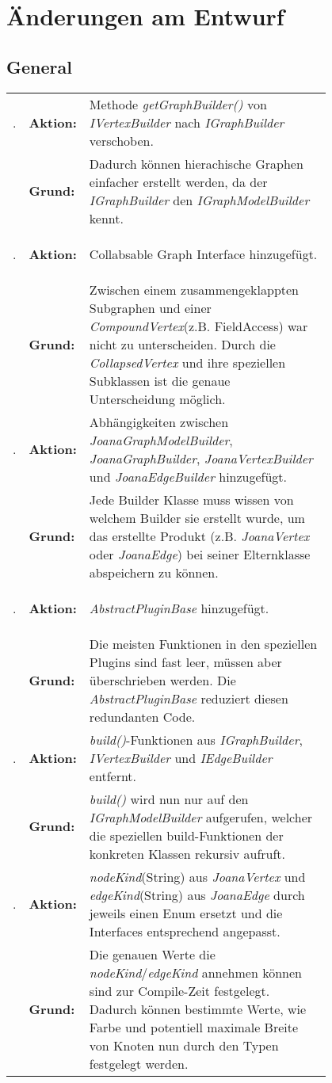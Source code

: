 \chapter{Änderungen am Entwurf}
\label{ch:aenderungen}

\newcommand\change[2]{\textbf{\arabic{cnr}}\addtocounter{cnr}{1}. & \textbf{Aktion:} & #1 \\ & \textbf{Grund:} & #2 \\ [1ex] }
\newcommand\inlineCode[1]{{\lstinline[basicstyle=\ttfamily\color{black}]|#1|}}
\section{General}
\setcounter{cnr}{1}

\begin{longtable}{llp{0.8\linewidth}}
	\change	{Methode \textit{getGraphBuilder()} von \textit{IVertexBuilder} nach  \textit{IGraphBuilder} verschoben.} 
			{Dadurch können hierachische Graphen einfacher erstellt werden, da der \textit{IGraphBuilder} den \textit{IGraphModelBuilder} kennt.}
			
	\change	{Collabsable Graph Interface hinzugefügt.} 
			{Zwischen einem zusammengeklappten Subgraphen und einer \textit{CompoundVertex}(z.B. FieldAccess) war nicht zu unterscheiden. Durch die \textit{CollapsedVertex} und ihre speziellen Subklassen ist die genaue Unterscheidung möglich.}
			
	\change	{Abhängigkeiten zwischen \textit{JoanaGraphModelBuilder}, \textit{JoanaGraphBuilder}, 
			\textit{JoanaVertexBuilder} und \textit{JoanaEdgeBuilder} hinzugefügt.} 
			{Jede Builder Klasse muss wissen von welchem Builder sie erstellt wurde, um das erstellte Produkt (z.B. \textit{JoanaVertex} oder \textit{JoanaEdge}) bei seiner Elternklasse abspeichern zu können.}
	
	\change	{\textit{AbstractPluginBase} hinzugefügt.} 
			{Die meisten Funktionen in den speziellen Plugins sind fast leer, müssen aber überschrieben werden. Die \textit{AbstractPluginBase} reduziert diesen redundanten Code.}
	
	\change	{\textit{build()}-Funktionen aus \textit{IGraphBuilder}, \textit{IVertexBuilder} und \textit{IEdgeBuilder} 
			entfernt.} 
			{\textit{build()} wird nun nur auf den \textit{IGraphModelBuilder} aufgerufen, welcher die speziellen build-Funktionen der konkreten Klassen rekursiv aufruft.}
	
	\change	{\textit{nodeKind}(String) aus \textit{JoanaVertex} und \textit{edgeKind}(String) aus \textit{JoanaEdge} 
			durch jeweils einen Enum ersetzt und die Interfaces entsprechend angepasst.} 
			{Die genauen Werte die \textit{nodeKind}/\textit{edgeKind} annehmen können sind zur Compile-Zeit festgelegt. Dadurch können bestimmte Werte, wie Farbe und potentiell maximale Breite von Knoten nun durch den Typen festgelegt werden.}
	

\end{longtable}
